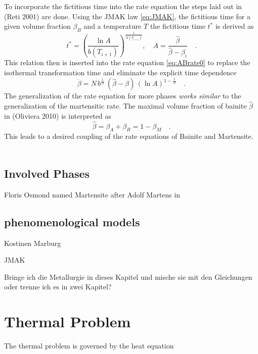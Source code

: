 To incorporate the fictitious time into the rate equation the steps laid out in (Reti 2001) are done. Using the JMAK law \ref{eq:JMAK}, the fictitious time for a given volume fraction $\beta_B$ and a temperature $T$ the fictitious time $t^\ast$ is derived as 
\begin{equation}
	t^\ast = \left( \frac{\ln A}{b(T_{i+1})}\right)^\frac{1}{N(T_{i+1})}, \quad A = \frac{\hat{\beta}}{\hat{\beta}-\beta_i}  \quad.
\end{equation}
This relation then is inserted into the rate equation \ref{eq:ABrate0} to replace the isothermal transformation time and eliminate the explicit time dependence 
\begin{equation}
	\dot{\beta} = N\,b^{\frac{1}{N}}\,(\hat{\beta}-\beta)\,\left(\ln A \right)^{1-\frac{1}{N}}\quad. \label{eq:ABrate}
\end{equation}
The generalization of the rate equation for more phases \textit{works similar} to the generalization of the martensitic rate. The maximal volume fraction of bainite $\hat{\beta}$ in (Oliviera 2010) is interpreted as 
\begin{equation}
	\hat{\beta} = \beta_A + \beta_B = 1 - \beta_M \quad. 
\end{equation}
This leads to a desired coupling of the rate equations of Bainite and Martensite. \\\\





\subsection{Involved Phases}
Floris Osmond named Martensite after Adolf Martens in \cite{osmond_microscopic_1904}

\subsection{phenomenological models}
Kostinen Marburg

JMAK 


Bringe ich die Metallurgie in dieses Kapitel und mische sie mit den Gleichungen oder trenne ich es in zwei Kapitel? 


\section{Thermal Problem}

The thermal problem is governed by the heat equation 
